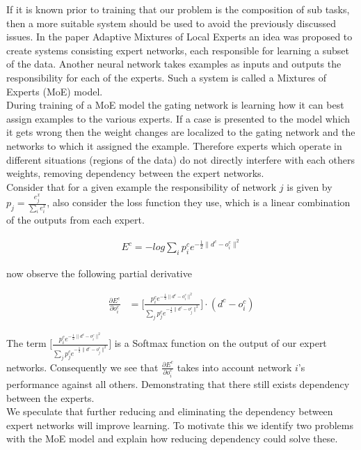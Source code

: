 \documentclass[notitlepage]{report}
\theoremstyle{definition}
\begin{document}
If it is known prior to training that our problem is the composition of sub tasks, then a more suitable system should be used to avoid the previously discussed issues. In the paper Adaptive Mixtures of Local Experts \cite{jacobs1991adaptive} an idea was proposed to create systems consisting expert networks, each responsible for learning a subset of the data. Another neural network takes examples as inputs and outputs the responsibility for each of the experts. Such a system is called a Mixtures of Experts (MoE) model.\\

During training of a MoE model the gating network is learning how it can best assign examples to the various experts. If a case is presented to the model which it gets wrong then the weight changes are localized to the gating network and the networks to which it assigned the example. Therefore experts which operate in different situations (regions of the data) do not directly interfere with each others weights, removing dependency between the expert networks.\\

Consider that for a given example the responsibility of network $j$ is given by $p_j = \frac{e^x_j}{\sum_i e^x_i}$,  also consider the loss function they use, which is a linear combination of the outputs from each expert.

\begin{align}
E^c = -log \sum_i p^c_i e^{-\frac{1}{2} \lVert d^c - o_i^c \rVert^2 }
\end{align}

now observe the following partial derivative

\begin{align*}
\frac{\partial E^c}{\partial o_i^c} &= \bigg[ \frac{p_i^c e^{-\frac{1}{2} \lVert d^c - o_i^c \rVert^2}}{\sum_j p_j^c e^{-\frac{1}{2} \lVert d^c - o_j^c \rVert^2}} \bigg] \cdot (d^c - o_i^c)	
\end{align*}

The term $\bigg[ \frac{p_i^c e^{-\frac{1}{2} \lVert d^c - o_i^c \rVert^2}}{\sum_j p_j^c e^{-\frac{1}{2} \lVert d^c - o_j^c \rVert^2}} \bigg]$ is a Softmax function on the output of our expert networks. Consequently we see that $\frac{\partial E^c}{\partial o_i^c}$ takes into account network $i$'s performance against all others. Demonstrating that there still exists dependency between the experts.\\

We speculate that further reducing and eliminating the dependency between expert networks will improve learning. To motivate this we identify two problems with the MoE model and explain how reducing dependency could solve these.\\ 
\end{document}
